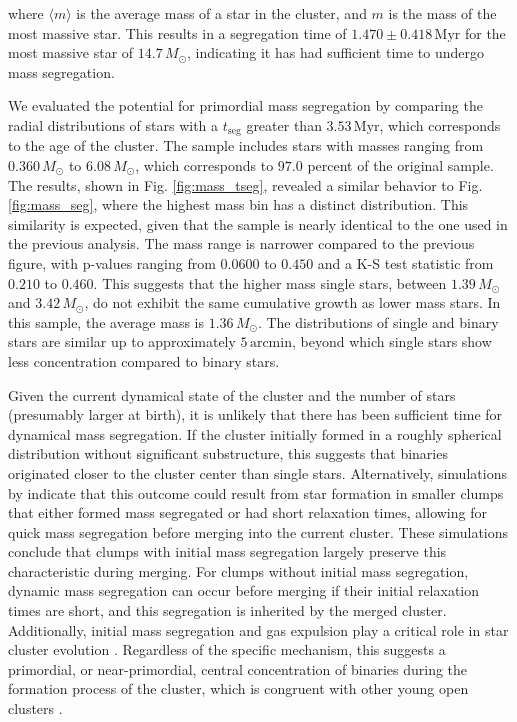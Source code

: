 \documentclass{aa}
\begin{document}
where $\langle m \rangle$ is the average mass of a star in the cluster, and $m$ is the mass of the most massive star. This results in a segregation time of $1.470 \pm 0.418\,\mathrm{Myr}$ for the most massive star of $14.7\,M_\odot$, indicating it has had sufficient time to undergo mass segregation.

We evaluated the potential for primordial mass segregation by comparing the radial distributions of stars with a $t_{\mathrm{seg}}$ greater than $3.53\,\mathrm{Myr}$, which corresponds to the age of the cluster. The sample includes stars with masses ranging from $0.360\,M_\odot$ to $6.08\,M_\odot$, which corresponds to $97.0$ percent of the original sample. The results, shown in Fig. \ref{fig:mass_tseg}, revealed a similar behavior to Fig. \ref{fig:mass_seg}, where the highest mass bin has a distinct distribution. This similarity is expected, given that the sample is nearly identical to the one used in the previous analysis. The mass range is narrower compared to the previous figure, with p-values ranging from $0.0600$ to $0.450$ and a K-S test statistic from $0.210$ to $0.460$. This suggests that the higher mass single stars, between $1.39\,M_\odot$ and $3.42\,M_\odot$, do not exhibit the same cumulative growth as lower mass stars. In this sample, the average mass is $1.36\,M_\odot$. The distributions of single and binary stars are similar up to approximately $5\,\mathrm{arcmin}$, beyond which single stars show less concentration compared to binary stars.

Given the current dynamical state of the cluster and the number of stars (presumably larger at birth), it is unlikely that there has been sufficient time for dynamical mass segregation. If the cluster initially formed in a roughly spherical distribution without significant substructure, this suggests that binaries originated closer to the cluster center than single stars. Alternatively, simulations by \citet{2007ApJ...655L..45M} indicate that this outcome could result from star formation in smaller clumps that either formed mass segregated or had short relaxation times, allowing for quick mass segregation before merging into the current cluster. These simulations conclude that clumps with initial mass segregation largely preserve this characteristic during merging. For clumps without initial mass segregation, dynamic mass segregation can occur before merging if their initial relaxation times are short, and this segregation is inherited by the merged cluster. Additionally, initial mass segregation and gas expulsion play a critical role in star cluster evolution \citep{2008MNRAS.386.2047M}. Regardless of the specific mechanism, this suggests a primordial, or near-primordial, central concentration of binaries during the formation process of the cluster, which is congruent with other young open clusters \citep{2007AJ....134.1368C,2007MNRAS.381L..40D,2008AJ....135..173S}.
\end{document}
